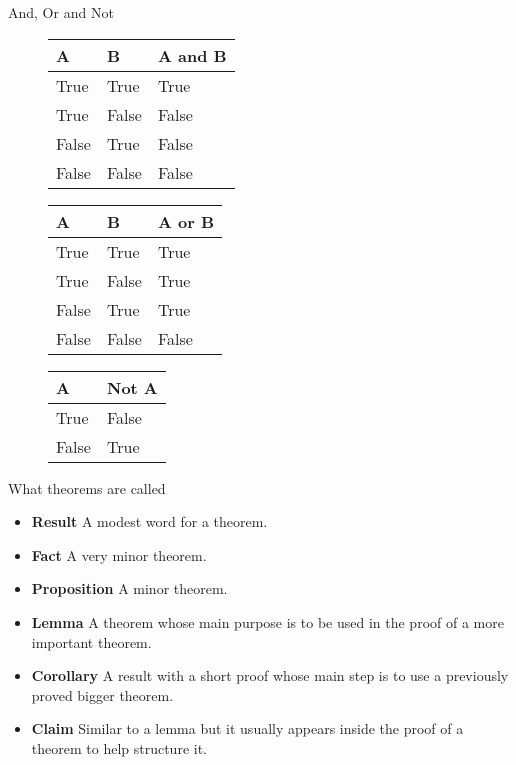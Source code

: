 \documentclass{beamer}
\begin{document}
\begin{frame}{And, Or and Not}

\begin{figure}
\centering
\begin{tabular}{| >{\centering\arraybackslash}b{1in} | >{\centering\arraybackslash}b{1in} || >{\centering\arraybackslash}b{1in}|}
\hline
A& B & A and B \\
\hline
True & True & True\\
True & False& False\\
False & True & False\\
False & False & False\\
\hline
\end{tabular}
\end{figure}

\begin{figure}
\centering
\begin{tabular}{| >{\centering\arraybackslash}b{1in} | >{\centering\arraybackslash}b{1in} || >{\centering\arraybackslash}b{1in}|}
\hline
A& B & A or B \\
\hline
\alert{True} & \alert{True} & \alert{True}\\
True & False& True\\
False & True & True\\
False & False & False\\
\hline
\end{tabular}
\end{figure}

\begin{figure}
\centering
\begin{tabular}{| >{\centering\arraybackslash}b{1in}  || >{\centering\arraybackslash}b{1in}|}
\hline
A& Not A \\
\hline
True & False\\
False & True\\
\hline
\end{tabular}
\end{figure}

\end{frame}

\begin{frame}{What theorems are called}
\begin{itemize}
\item \textbf{Result} A modest word for a theorem.\pause
\item \textbf{Fact} A very minor theorem. \pause
\item \textbf{Proposition} A minor theorem.\pause
\item \textbf{Lemma} A theorem whose main purpose is to be used in the proof of a more important theorem.\pause
\item \textbf{Corollary} A result with a short proof whose main step is to use a previously proved bigger theorem.\pause
\item \textbf{Claim} Similar to a lemma but it usually appears inside the proof of a theorem to help structure it.
\end{itemize}
\end{frame}
\end{document}
